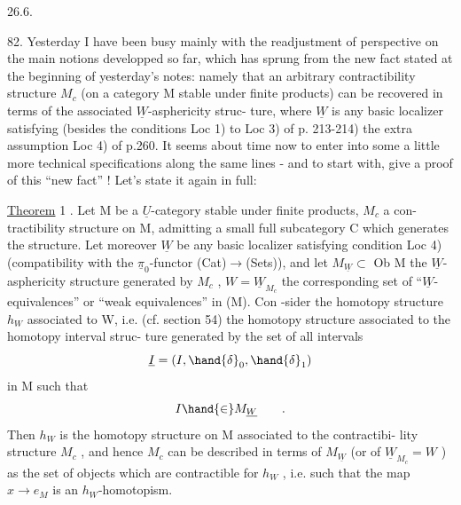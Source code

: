 
26.6.

82. Yesterday I have been busy mainly with the readjustment of  
perspective on the main notions developped so far, which has sprung from
the new fact stated at the beginning of yesterday's notes: namely that an
arbitrary contractibility structure $M_c$ (on a category M stable under finite
products) can be recovered in terms of the associated $\underline{W}$-asphericity struc-%
ture, where $\underline{W}$ is any basic localizer satisfying (besides the conditions
Loc 1) to Loc 3) of p. 213-214) the extra assumption Loc 4) of p.260. It
seems about time now to enter into some  a little more technical
specifications along the same lines - and to start with, give a proof
of this ``new fact'' ! Let's state it again in full:

\uline{Theorem} 1 . Let M be a $\underline{U}$-category stable under finite products, $M_c$  a con-%
tractibility structure on M, admitting a small full subcategory C which
generates the structure. Let moreover $\underline{W}$ be any basic localizer satisfying
condition Loc 4) (compatibility with the $\underline{\pi}_0$-functor (Cat)$\longrightarrow$(Sets)), and
let $M_{\underline{W}} \subset$ Ob M the $\underline{W}$-asphericity structure generated by $M_c$ , $W = \underline{W}_{M_c}$ the
corresponding set of ``$\underline{W}$-equivalences'' or ``weak equivalences'' in (M). Con
-sider the homotopy structure $h_W$ associated to W, i.e. (cf. section 54)
the homotopy  structure associated to the homotopy interval struc-%
ture  generated by the set  of all intervals
\[ \underline{I} = (I, \hand{\delta}_0, \hand{\delta}_1) \]
in M such that
\[ I \hand{\in} M_{\underline{W}} \qquad . \]
Then $h_W$  is the homotopy structure on M associated to the contractibi-%
lity structure $M_c$ , and hence $M_c$ can be described in terms of $M_{\underline{W}}$ (or of
$\underline{W}_{M_c} = W$ ) as the set of objects which are contractible for $h_W$ , i.e. such
that the map $x \longrightarrow e_M$ is an $h_W$-homotopism.

